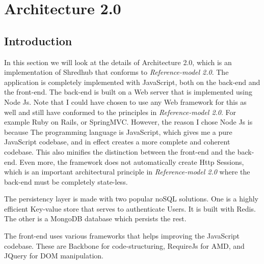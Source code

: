 \chapter{Architecture 2.0}
\section{Introduction}
In this section we will look at the details of Architecture 2.0, which is an implementation of Shredhub that conforms to \textit{Reference-model 2.0}. The application is completely implemented with JavaScript, both on the back-end and the front-end. The back-end is built on a Web server that is implemented using Node Js.  Note that I could have chosen to use any Web framework for this as well and still have conformed to the principles in \textit{Reference-model 2.0}. For example Ruby on Rails, or SpringMVC. However, the reason I chose Node Js is because The programming language is JavaScript, which gives me a pure JavaScript codebase, and in effect creates a more complete and coherent codebase. This also minifies the distinction between the front-end and the back-end. Even more, the framework does not automatically create Http Sessions, which is an important architectural principle in \textit{Reference-model 2.0}  where the back-end must be completely state-less.

The persistency layer is made with two popular noSQL solutions. One is a highly efficient Key-value store that serves to authenticate Users. It is built with Redis. The other is a MongoDB database which persists the rest. 

 The front-end uses various frameworks that helps improving the JavaScript codebase. These are Backbone for code-structuring, RequireJs for AMD, and JQuery for DOM manipulation.

% 
%
% 
%	  
%		  
%		  	  
%		

